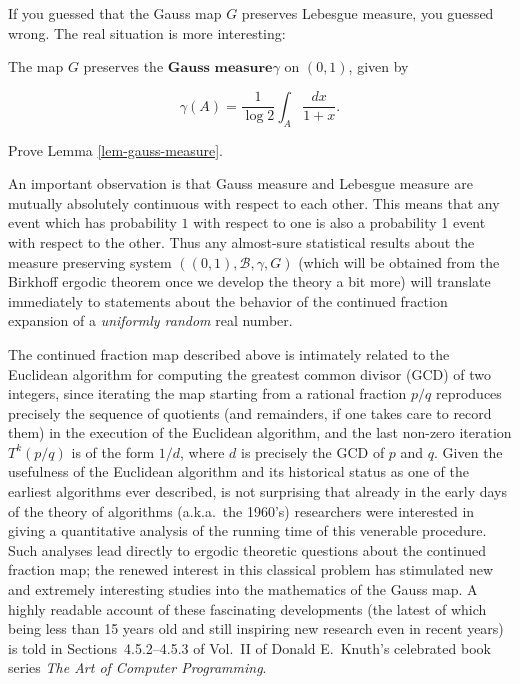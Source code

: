 \begin{enumerate}[label=\arabic*.]
If you guessed that the Gauss map $G$ preserves
Lebesgue measure, you guessed wrong. The real
situation is more interesting:

\begin{lem}
\label{lem-gauss-measure}
The map $G$ preserves the $\textbf{Gauss measure}$$\gamma$ on $(0,1)$, given by

\[
\gamma(A) = \frac{1}{\log 2} \int_A \frac{dx}{1+x}.
\]

\end{lem}

\begin{xexercise}
Prove Lemma \ref{lem-gauss-measure}.
\end{xexercise}

\noindent An important observation is that Gauss measure and
Lebesgue measure are mutually absolutely continuous
with respect to each other. This means that any event
which has probability $1$ with respect to one is also
a probability 1 event with respect to the other. Thus
any almost-sure statistical results about the measure
preserving system $((0,1),\mathcal{B},\gamma,G)$
(which will be obtained from the Birkhoff ergodic
theorem once we develop the theory a bit more) will
translate immediately to statements about the behavior
of the continued fraction expansion of a \emph{uniformly
random} real number.

The continued fraction map described above is
intimately related to the Euclidean algorithm for
computing the greatest common divisor (GCD) of two
integers, since iterating the map starting from a
rational fraction $p/q$ reproduces precisely the
sequence of quotients (and remainders, if one takes
care to record them) in the execution of the Euclidean
algorithm, and the last non-zero iteration $T^k(p/q)$
is of the form $1/d$, where $d$ is precisely the GCD
of $p$ and $q$. Given the usefulness of the Euclidean
algorithm and its historical status as one of the
earliest algorithms ever described, is not surprising
that already in the early days of the theory of
algorithms (a.k.a.\ the 1960's) researchers were
interested in giving a quantitative analysis of the
running time of this venerable procedure. Such
analyses lead directly to ergodic theoretic questions
about the continued fraction map; the renewed interest
in this classical problem has stimulated new and
extremely interesting studies into the mathematics of
the Gauss map. A highly readable account of these
fascinating developments (the latest of which being
less than 15 years old and still inspiring new
research even in recent years) is told in
Sections~4.5.2--4.5.3 of Vol.~II of Donald E.\ Knuth's
celebrated book series \emph{The Art of Computer
Programming}.


\end{enumerate}

